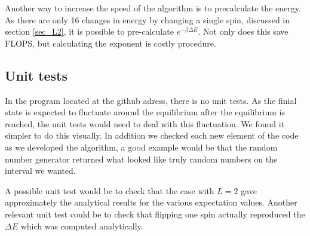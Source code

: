 	Another way to increase the speed of the algorithm is to precalculate the energy. As there are only 16 changes in energy by changing a single spin, discussed in section \ref{sec_L2}, it is possible to pre-calculate $ e^{-\beta \Delta E} $. Not only does this save FLOPS, but calculating the exponent is costly procedure. 

\subsection{Unit tests}

In the program located at the github adress, there is no unit tests. As the finial state is expected to fluctuate around the equilibrium after the equilibrium is reached, the unit tests would need to deal with this fluctuation. We found it simpler to do this visually. In addition we checked each new element of the code as we developed the algorithm, a good example would be that the random number generator returned what looked like truly random numbers on the interval we wanted. 


A possible unit test would be to check that the case with $ L=2 $ gave approximately the analytical results for the various expectation values. Another relevant unit test could be to check that flipping one spin actually reproduced the $ \Delta E $ which was computed analytically. 

